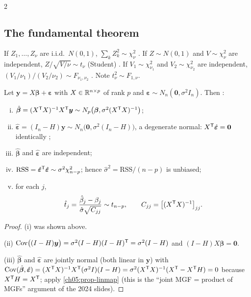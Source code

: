 \begin{paracol}{2}
\subsection{The fundamental theorem}
\begin{definition}
If $Z_1,\dots,Z_\nu$ are i.i.d.\ $N(0,1)$, $\sum_kZ_k^2\sim\chi^2_\nu$ . If $Z\sim N(0,1)$ and
$V\sim\chi^2_\nu$ are independent, $Z/\sqrt{V/\nu}\sim t_\nu$ (Student) . If $V_1\sim\chi^2_{\nu_1}$ and
$V_2\sim\chi^2_{\nu_2}$ are independent, $(V_1/\nu_1)/(V_2/\nu_2)\sim F_{\nu_1,\nu_2}$ . Note $t_\nu^2\sim F_{1,\nu}$.
\end{definition}

\begin{theorem}\label{ch05:thm-normal}
Let $\bm y=X\bm\beta+\bm\varepsilon$ with $X\in\mathbb{R}^{n\times p}$ of rank $p$ and $\bm\varepsilon\sim N_n(\bm 0,\sigma^2I_n)$. Then
 :
\begin{enumerate}[(i)]
  \item $\hat{\bm\beta}=(X^{\mathsf T} X)^{-1}X^{\mathsf T}\bm y\sim N_p\bigl(\bm\beta,\sigma^2(X^{\mathsf T} X)^{-1}\bigr)$;
  \item $\hat{\bm\varepsilon}=(I_n-H)\bm y\sim N_n\bigl(\bm 0,\sigma^2(I_n-H)\bigr)$, a degenerate normal: $X^{\mathsf T}\hat{\bm\varepsilon}=\bm 0$ identically
        ;
  \item $\hat{\bm\beta}$ and $\hat{\bm\varepsilon}$ are independent;
  \item $\text{RSS}=\hat{\bm\varepsilon}^{\mathsf T}\hat{\bm\varepsilon}\sim\sigma^2\chi^2_{n-p}$; hence $\hat\sigma^2=\text{RSS}/(n-p)$ is unbiased;
  \item for each $j$,
        \begin{equation}\label{ch05:eq-tstat}
          \hat t_j=\frac{\hat\beta_j-\beta_j}{\hat\sigma\sqrt{C_{jj}}}\sim t_{n-p},\qquad C_{jj}=\bigl[(X^{\mathsf T} X)^{-1}\bigr]_{jj}.
        \end{equation}
\end{enumerate}
\end{theorem}
\begin{proof}
(i) was shown above.

(ii) $\operatorname{Cov}\bigl((I-H)\bm y\bigr)=\sigma^2(I-H)(I-H)^{\mathsf T}=\sigma^2(I-H)$ and $(I-H)X\bm\beta=\bm 0$.

(iii) $\hat{\bm\beta}$ and $\hat{\bm\varepsilon}$ are jointly normal (both linear in $\bm y$) with
$\operatorname{Cov}(\hat{\bm\beta},\hat{\bm\varepsilon})=(X^{\mathsf T} X)^{-1}X^{\mathsf T}(\sigma^2I)(I-H)=\sigma^2(X^{\mathsf T} X)^{-1}(X^{\mathsf T}-X^{\mathsf T} H)=0$ because $X^{\mathsf T} H=X^{\mathsf T}$; apply
\cref{ch05:prop-linmap} (this is the ``joint MGF = product of MGFs'' argument of the 2024 slides).


\end{proof}
\end{paracol}

